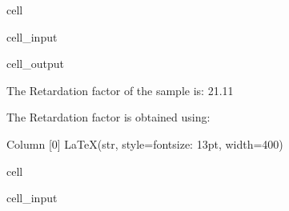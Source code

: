 \documentclass[letterpaper,10pt,english]{jupyterBook}
\begin{document}
\begin{sphinxuseclass}{cell}
\begin{sphinxVerbatimInput}
\begin{sphinxuseclass}{cell_input}
\begin{sphinxVerbatim}[commandchars=\\\{\}]

\end{sphinxVerbatim}

\end{sphinxuseclass}\end{sphinxVerbatimInput}
\begin{sphinxVerbatimOutput}

\begin{sphinxuseclass}{cell_output}
\begin{sphinxVerbatim}[commandchars=\\\{\}]
The Retardation factor of the sample is: 21.11 

The Retardation factor is obtained using:
\end{sphinxVerbatim}

\begin{sphinxVerbatim}[commandchars=\\\{\}]
Column
    [0] LaTeX(str, style=\PYGZob{}\PYGZsq{}font\PYGZhy{}size\PYGZsq{}: \PYGZsq{}13pt\PYGZsq{}\PYGZcb{}, width=400)
\end{sphinxVerbatim}

\end{sphinxuseclass}\end{sphinxVerbatimOutput}

\end{sphinxuseclass}
\begin{sphinxuseclass}{cell}\begin{sphinxVerbatimInput}

\begin{sphinxuseclass}{cell_input}
\begin{sphinxVerbatim}[commandchars=\\\{\}]
\end{sphinxVerbatim}

\end{sphinxuseclass}\end{sphinxVerbatimInput}

\end{sphinxuseclass}
\end{document}
